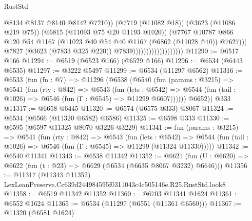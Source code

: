 \begin{lexlean}{RustStd}
\begin{coremodule}
                                                @8134
                                                @8137
                                                @8140
                                                @8142
                                                @7210))
                                            (@7719 (@11082 @18))
                                            (@3623 (@11086 @219 @75))
                                            (@6815 (@11093 @75 @20 @1193 @1020))
                                            (@7767
                                              @10787
                                              @866
                                              @120
                                              @54
                                              @1167
                                              (@11023
                                                @40
                                                @54
                                                @40
                                                @1167
                                                (@6862 (@11028 @40))
                                                @7627)))
                                          @7827
                                          (@3623 (@7833 @325 @220))
                                          @7839)))))))))))))))))))
@11290 := @6517 @166
@11294 := @6519 (@6523 @166) (@6529 @166)
@11296 := @6534 (@6443 @6535)
@11297 := @3222 @5497
@11299 := @6534 (@11297 @6562)
@11316 := @6533
    (fun (fn : @7) =>
    @11296
      (@6538
        (@6540
          (fun (params : @3215) =>
          @6541
            (fun (rty : @842) =>
            @6543
              (fun (lets : @6542) =>
              @6544 (fun (tail : @1026) => @6546 (fun (Γ : @6545) => @11299 @6607))))))
        @6652))
    @333
@11317 := @6658 @6445
@11320 := @6574 (@6575 @333) @8067
@11324 := @6534 (@6566 (@11320 @6582) @6586)
@11325 := @6598 @333
@11330 := @6595 (@6597 @11325 @8070 @3226 @3229)
@11341 := fun (params : @3215) =>
  @6541
    (fun (rty : @842) =>
    @6543
      (fun (lets : @6542) =>
      @6544 (fun (tail : @1026) => @6546 (fun (Γ : @6545) => @11299 (@11324 @11330)))))
@11342 := @6540 @11341
@11343 := @6538 @11342
@11352 := @6621
    (fun (U : @6620) => @6622 (fun (t : @23) => @6629 (@6534 (@6635 @8067 @3232) @6646)))
@11356 := @11317 (@11343 @11352) LexLeanPreserve.Cc639d244984595f0311043c4c505146e.R25.RustStd.look8
@11358 := @6519 @11342 @11352
@11360 := @6703 @11341 @1624
@11361 := @6552 @1624
@11365 := @6534 (@11297 (@6551 (@11361 @6560)))
@11367 := @11320 (@6581 @1624)

\end{coremodule}
\end{lexlean}
